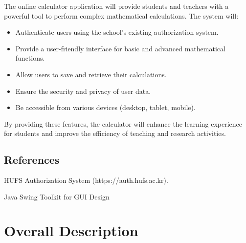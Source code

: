 \documentclass{scrreprt}
\begin{document}
The online calculator application will provide students and teachers with a powerful tool to perform complex mathematical calculations. The system will:
\begin{itemize}
    \item Authenticate users using the school's existing authorization system.
    \item Provide a user-friendly interface for basic and advanced mathematical functions.
    \item Allow users to save and retrieve their calculations.
    \item Ensure the security and privacy of user data.
    \item Be accessible from various devices (desktop, tablet, mobile).
\end{itemize}
By providing these features, the calculator will enhance the learning experience for students and improve the efficiency of teaching and research activities.

\section{References}
\let\oldchapter\chapter
\let\chapter\section
\begingroup
\renewcommand{\chapter}[2]{}
\begin{thebibliography}{10}
 HUFS Authorization System (https://auth.hufs.ac.kr).

 Java Swing Toolkit for GUI Design

\end{thebibliography}
\endgroup

\let\chapter\oldchapter

\chapter{Overall Description}
\label{sec:overall}
\end{document}
